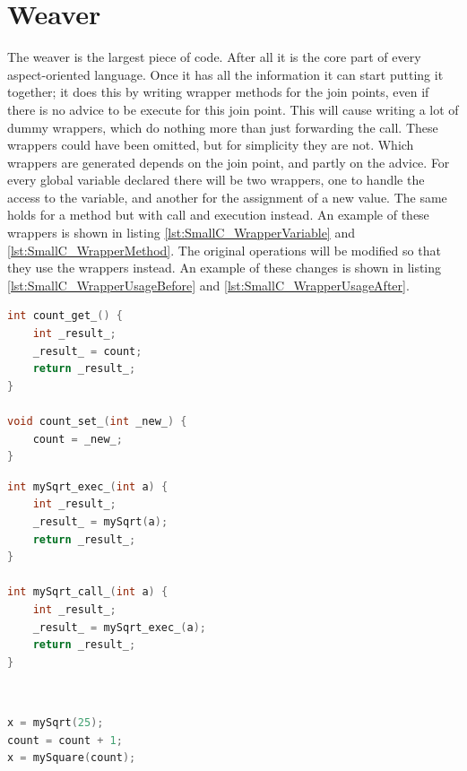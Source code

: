 \documentclass[a4paper]{report}
\begin{document}
\section{Weaver}
The weaver is the largest piece of code. After all it is the core part of every aspect-oriented language. Once it has all the information it can start putting it together; it does this by writing wrapper methods for the join points, even if there is no advice to be execute for this join point. This will cause writing a lot of dummy wrappers, which do nothing more than just forwarding the call. These wrappers could have been omitted, but for simplicity they are not. Which wrappers are generated depends on the join point, and partly on the advice. For every global variable declared there will be two wrappers, one to handle the access to the variable, and another for the assignment of a new value. The same holds for a method but with call and execution instead. An example of these wrappers is shown in listing \ref{lst:SmallC_WrapperVariable} and \ref{lst:SmallC_WrapperMethod}. The original operations will be modified so that they use the wrappers instead. An example of these changes is shown in listing \ref{lst:SmallC_WrapperUsageBefore} and \ref{lst:SmallC_WrapperUsageAfter}.\\
\begin{minipage}{0.45\textwidth}
\begin{lstlisting}[language=C, caption=Example of variable wrappers., label=lst:SmallC_WrapperVariable]
int count_get_() {
	int _result_;
	_result_ = count;
	return _result_;
}

void count_set_(int _new_) {
	count = _new_;
}
\end{lstlisting}
\end{minipage}\hfill
\begin{minipage}{0.45\textwidth}
\begin{lstlisting}[language=C, caption=Example of method wrappers., label=lst:SmallC_WrapperMethod]
int mySqrt_exec_(int a) {
	int _result_;
	_result_ = mySqrt(a);
	return _result_;
}

int mySqrt_call_(int a) {
	int _result_;
	_result_ = mySqrt_exec_(a);
	return _result_;
}
\end{lstlisting}
\end{minipage}\\
\begin{minipage}{0.45\textwidth}
\begin{lstlisting}[language=C, caption=Example of code before weaving., label=lst:SmallC_WrapperUsageBefore]
x = mySqrt(25);
count = count + 1;
x = mySquare(count);
\end{lstlisting}
\end{minipage}\hfill
\end{document}
